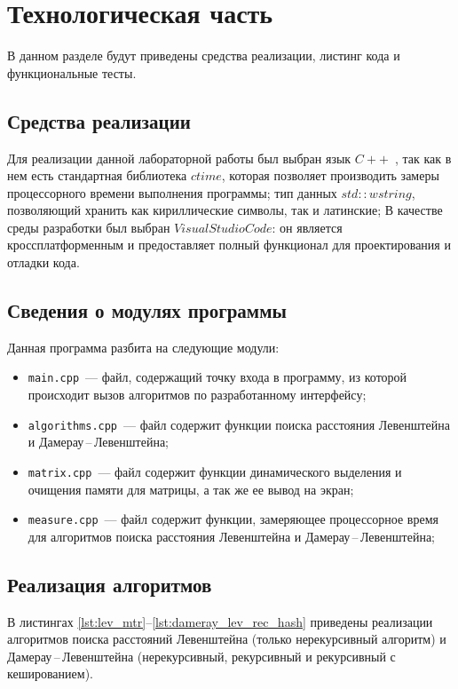 \chapter{Технологическая часть}

В данном разделе будут приведены средства реализации, листинг кода и функциональные тесты.

\section{Средства реализации}

Для реализации данной лабораторной работы был выбран язык $C++$~\cite{cpp-lang}, так как в нем есть стандартная библиотека $ctime$, которая позволяет производить замеры процессорного времени выполнения программы; тип данных $std::wstring$, позволяющий хранить как кириллические символы, так и латинские;
В качестве среды разработки был выбран $Visual Studio Code$: он является кроссплатформенным и предоставляет полный функционал для проектирования и отладки кода.
 
\section{Сведения о модулях программы}

Данная программа разбита на следующие модули:

\begin{itemize}
	\item \texttt{main.cpp}~--- файл, содержащий точку входа в программу, из которой происходит вызов алгоритмов по разработанному интерфейсу;
	\item \texttt{algorithms.cpp}~--- файл содержит функции поиска расстояния Левенштейна и Дамерау\,--\,Левенштейна;
	\item \texttt{matrix.cpp}~--- файл содержит функции динамического выделения и очищения памяти для матрицы, а так же ее вывод на экран;
	\item \texttt{measure.cpp}~--- файл содержит функции, замеряющее процессорное время для алгоритмов поиска расстояния Левенштейна и Дамерау\,--\,Левенштейна;
\end{itemize}

\section{Реализация алгоритмов}

В листингах \ref{lst:lev_mtr}--\ref{lst:dameray_lev_rec_hash} приведены реализации алгоритмов поиска расстояний Левенштейна (только нерекурсивный алгоритм) и Дамерау\,--\,Левенштейна (нерекурсивный, рекурсивный и рекурсивный с кешированием).

